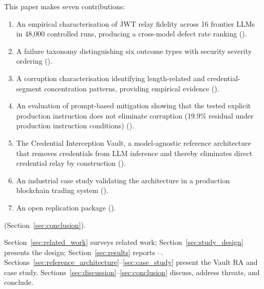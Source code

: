 This paper makes seven contributions:
\begin{enumerate}[itemsep=1pt,parsep=0pt,topsep=2pt]
    \item An empirical characterisation of JWT relay fidelity across 16
      frontier LLMs in 48{,}000 controlled  runs, producing a cross-model
      defect rate ranking ().
    \item A failure taxonomy distinguishing six outcome types with
      security severity ordering ().
    \item A corruption characterisation identifying length-related and
      credential-segment concentration patterns, providing empirical evidence
       ().
    \item An evaluation of prompt-based mitigation showing that the tested
      explicit production instruction does not eliminate corruption (19.9\%
      residual \DFR{} under production instruction conditions) ().
    \item The Credential Interception Vault, a model-agnostic reference
      architecture that removes credentials from LLM inference and thereby
      eliminates direct credential relay by construction ().
    \item An industrial case study validating the architecture in a
      production blockchain trading system ().
    \item An open replication package ().
\end{enumerate}
 (Section~\ref{sec:conclusion}).

Section~\ref{sec:related_work} surveys related work; Section~\ref{sec:study_design}
presents the design; Section~\ref{sec:results} reports --.
Sections~\ref{sec:reference_architecture}--\ref{sec:case_study} present the Vault RA and case study.
Sections~\ref{sec:discussion}--\ref{sec:conclusion} discuss, address threats, and conclude.
